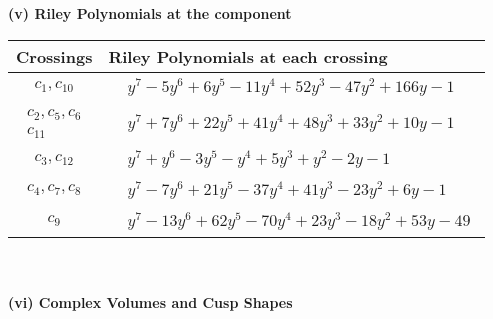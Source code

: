 \documentclass[1p]{elsarticle_modified}
\theoremstyle{definition}
\begin{document}
\newpage\renewcommand{\arraystretch}{1}
\flushleft \textbf{(v) Riley Polynomials at the component}\newline \\
\begin{tabular}{m{50pt}|m{274pt}}
Crossings & \hspace{64pt}Riley Polynomials at each crossing \\
\hline $$\begin{aligned}c_{1},c_{10}\end{aligned}$$&$\begin{aligned}
&y^7-5 y^6+6 y^5-11 y^4+52 y^3-47 y^2+166 y-1
\end{aligned}$\\
\hline $$\begin{aligned}c_{2},c_{5},c_{6}\\c_{11}\end{aligned}$$&$\begin{aligned}
&y^7+7 y^6+22 y^5+41 y^4+48 y^3+33 y^2+10 y-1
\end{aligned}$\\
\hline $$\begin{aligned}c_{3},c_{12}\end{aligned}$$&$\begin{aligned}
&y^7+y^6-3 y^5- y^4+5 y^3+y^2-2 y-1
\end{aligned}$\\
\hline $$\begin{aligned}c_{4},c_{7},c_{8}\end{aligned}$$&$\begin{aligned}
&y^7-7 y^6+21 y^5-37 y^4+41 y^3-23 y^2+6 y-1
\end{aligned}$\\
\hline $$\begin{aligned}c_{9}\end{aligned}$$&$\begin{aligned}
&y^7-13 y^6+62 y^5-70 y^4+23 y^3-18 y^2+53 y-49
\end{aligned}$\\
\hline
\end{tabular}\\~\\
\newpage\flushleft \textbf{(vi) Complex Volumes and Cusp Shapes}
\end{document}
